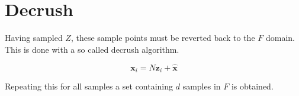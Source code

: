 \documentclass[11pt,a4paper,english]{article}
\begin{document}
\section{Decrush}

Having sampled $Z$, these sample points must be reverted back to the $F$ domain. This is done with a so called decrush algorithm. 

\begin{equation}
	\mathbf{x}_i = N \mathbf{z}_i + \mathbf{\hat{x}}
\end{equation}

Repeating this for all samples a set containing $d$ samples in $F$ is obtained. 


\clearpage
\printbibliography
\end{document}

